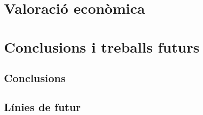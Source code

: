 \documentclass[CAT,BIB]{TFUOC}%
\begin{document}
\chapter{Valoració econòmica}

\chapter{Conclusions i treballs futurs}

    \section{Conclusions}


    \section{Línies de futur}
\end{document}
